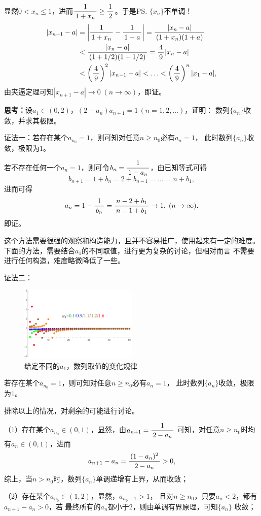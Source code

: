 显然$0<x_n\leq1$，进而$\displaystyle\frac{\,{1}\,}{\,{1+x_n}\,}\geq\displaystyle\frac{\,{1}\,}{\,{2}\,}$。于是\ps{$\{x_n\}$不单调！}
\begin{align}
	|x_{n+1}-a|&=\left|\displaystyle\frac{\,{1}\,}{\,{1+x_n}\,}-\displaystyle\frac{\,{1}\,}{\,{1+a}\,}\right|=\displaystyle\frac{\,{|x_n-a|}\,}{\,{(1+x_n)(1+a)}\,}\notag\\
	&<\displaystyle\frac{\,{|x_n-a|}\,}{\,{(1+1/2)(1+1/2)}\,}=\displaystyle\frac{\,{4}\,}{\,{9}\,}|x_n-a|\notag\\
	&<\left(\displaystyle\frac{\,{4}\,}{\,{9}\,}\right)^2|x_{n-1}-a|<\ldots<\left(\displaystyle\frac{\,{4}\,}{\,{9}\,}\right)^{n}|x_1-a|,\notag
\end{align}
由夹逼定理可知$|x_{n+1}-a|\to0\;(n\to\infty)$，即证。
\fi

\bs
{\bf 思考：}设$a_1\in(0,2)$，$(2-a_n)a_{n+1}=1\,(n=1,2,\ldots)$，证明：
数列$\{a_n\}$收敛，并求其极限。

\ifhint
证法一：若存在某个$a_{n_0}=1$，则可知对任意$n\geq n_0$必有$a_n=1$，
此时数列$\{a_n\}$收敛，极限为$1$。

若不存在任何一个$a_n=1$，则可令$b_n=\displaystyle\frac{\,{1}\,}{\,{1-a_n}\,}$，由已知等式可得
$$b_{n+1}=1+b_n=2+b_{n-1}=\ldots=n+b_1,$$
进而可得
$$a_n=1-\displaystyle\frac{\,{1}\,}{\,{b_n}\,}=\displaystyle\frac{\,{n-2+b_1}\,}{\,{n-1+b_1}\,}\to 1,\;(n\to\infty).$$
即证。\fin

这个方法需要很强的观察和构造能力，且并不容易推广，使用起来有一定的难度。
下面的方法，需要结合$a_1$的不同取值，进行更为复杂的讨论，但相对而言
不需要进行任何构造，难度略微降低了一些。

证法二：
\begin{figure}[h]
	\centering
	\includegraphics[width=0.5\textwidth]
	{./Images/Ch01/a2a.pdf}
	\caption{给定不同的$a_1$，数列取值的变化规律}
	\label{fig:a2a}
\end{figure}

若存在某个$a_{n_0}=1$，则可知对任意$n\geq n_0$必有$a_n=1$，
此时数列$\{a_n\}$收敛，极限为$1$。

排除以上的情况，对剩余的可能进行讨论。

（1）存在某个$a_{n_0}\in(0,1)$，显然，由$a_{n+1}=\displaystyle\frac{\,{1}\,}{\,{2-a_n}\,}$
可知，对任意$n\geq n_0$时均有$a_n\in(0,1)$，进而
$$a_{n+1}-a_n=\displaystyle\frac{\,{(1-a_n)^2}\,}{\,{2-a_n}\,}>0,$$
综上，当$n>n_0$时，数列$\{a_n\}$单调递增有上界，从而收敛；

（2）存在某个$a_{n_0}\in(1,2)$，显然，$a_{n_0+1}>1$，
且对$n\geq n_0$，只要$a_n<2$，都有$a_{n+1}-a_n>0$，若
最终所有的$a_n$都小于$2$，则由单调有界原理，可知$\{a_n\}$
收敛；

